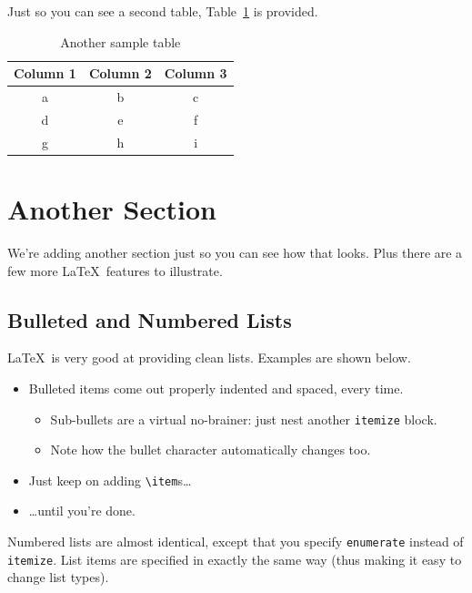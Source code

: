 \documentclass{article}
\begin{document}
Just so you can see a second table, Table~\ref{table-sample2} is provided.

\begin{table}
\centering
\begin{tabular}{|c|c|c|}\hline
Column 1 & Column 2 & Column 3 \\\hline\hline
a & b & c \\
d & e & f \\
g & h & i \\\hline
\end{tabular}

\caption{Another sample table}
\label{table-sample2}
\end{table}

\section{Another Section}

We're adding another section just so you can see how that looks.  Plus there are a few more \LaTeX\ features to illustrate.

\subsection{Bulleted and Numbered Lists}

\LaTeX\ is very good at providing clean lists.  Examples are shown below.

\begin{itemize}
\item Bulleted items come out properly indented and spaced, every time.

\begin{itemize}
\item Sub-bullets are a virtual no-brainer: just nest another \verb!itemize! block.
\item Note how the bullet character automatically changes too.
\end{itemize}

\item Just keep on adding \verb!\item!s\ldots

\item \ldots until you're done.
\end{itemize}

Numbered lists are almost identical, except that you specify \verb!enumerate! instead of \verb!itemize!.  List items are specified in exactly the same way (thus making it easy to change list types).
\end{document}

